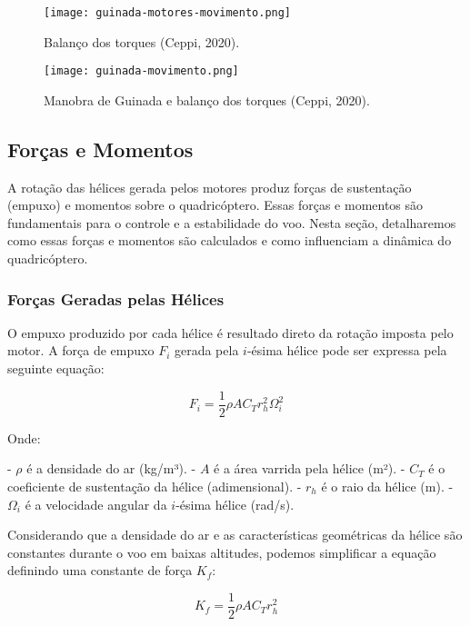 \begin{figure}[H]
	\centering
	\texttt{[image: guinada-motores-movimento.png]}
	\caption{Balanço dos torques (Ceppi, 2020).}
	\label{fig:yaw_torques}
\end{figure}


\begin{figure}[H]
	\centering
	\texttt{[image: guinada-movimento.png]} %
	\caption{Manobra de Guinada e balanço dos torques (Ceppi, 2020).}
	\label{fig:yaw_maneuver_torques}
\end{figure}

\subsection{Forças e Momentos}

A rotação das hélices gerada pelos motores produz forças de sustentação (empuxo) e momentos sobre o quadricóptero. Essas forças e momentos são fundamentais para o controle e a estabilidade do voo. Nesta seção, detalharemos como essas forças e momentos são calculados e como influenciam a dinâmica do quadricóptero.

\subsubsection{Forças Geradas pelas Hélices}

O empuxo produzido por cada hélice é resultado direto da rotação imposta pelo motor. A força de empuxo \( F_i \) gerada pela \( i \)-ésima hélice pode ser expressa pela seguinte equação:

\begin{equation}
F_i = \frac{1}{2} \rho A C_T r_h^2 \Omega_i^2
\label{eq:forca_empuxo}
\end{equation}

Onde:

- \( \rho \) é a densidade do ar (kg/m³).
- \( A \) é a área varrida pela hélice (m²).
- \( C_T \) é o coeficiente de sustentação da hélice (adimensional).
- \( r_h \) é o raio da hélice (m).
- \( \Omega_i \) é a velocidade angular da \( i \)-ésima hélice (rad/s).

Considerando que a densidade do ar e as características geométricas da hélice são constantes durante o voo em baixas altitudes, podemos simplificar a equação definindo uma constante de força \( K_f \):

\begin{equation}
K_f = \frac{1}{2} \rho A C_T r_h^2
\label{eq:constante_forca}
\end{equation}

